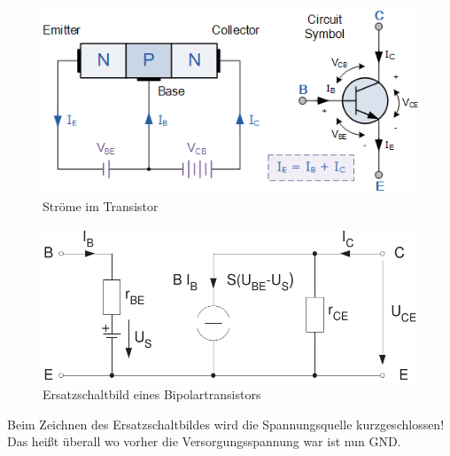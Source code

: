 \documentclass[a5paper, 12pt, twoside]{scrartcl}
\begin{document}
\begin{minipage}{.49\linewidth}
  \begin{figure}[H]
    \centering
    \includegraphics[width=\textwidth]{Transistor}
    \caption{Ströme im Transistor}
  \end{figure}
\end{minipage}\hfill\vline\hfill%
\begin{minipage}{.49\linewidth}
  \begin{figure}[H]
    \centering
    \includegraphics[width=\textwidth]{ESBTransistor}
    \caption{Ersatzschaltbild eines Bipolartransistors}
  \end{figure}
\end{minipage}

 Beim Zeichnen des Ersatzschaltbildes wird die Spannungsquelle kurzgeschlossen! Das heißt überall wo vorher die Versorgungsspannung war ist nun GND.\@
\end{document}
